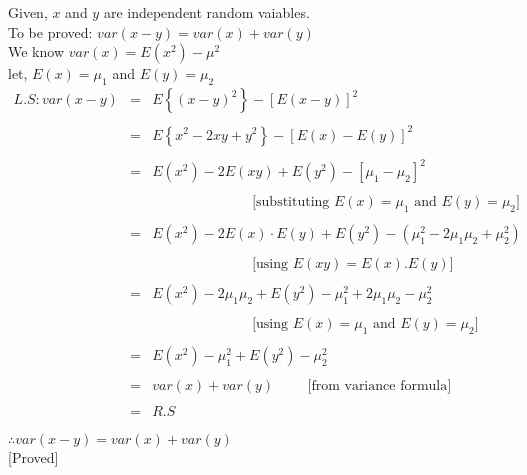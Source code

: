 \documentclass{article}
\begin{document}
\Large{
    Given, $x$ and $y$ are independent random vaiables. \\

    To be proved: $var (x-y) = var(x) + var(y)$\\

    We know $var(x) = E(x^2)-\mu^2$\\

    let, $E(x)=\mu_1$ and $E(y)=\mu_2$\\
    \begin{eqnarray*}
        L.S: var(x-y) &=& E\left\{(x-y)^2\right\} -\left[E(x-y)\right]^2\\\\
        &=& E\left\{x^2-2xy+y^2\right\}-\left[E(x)-E(y)\right]^2\\\\
        &=& E(x^2) - 2E(xy) + E(y^2)- [\mu_1 - \mu_2]^2\\\\
        && \hspace{3cm}\text{[substituting $E(x)=\mu_1$ and $E(y)=\mu_2$]}\\\\
        &=& E(x^2) - 2E(x)\cdot E(y)+ E(y^2)-\left(\mu_1^2 - 2\mu_1\mu_2 + \mu_2^2\right)\\\\
        && \hspace{3cm}\text{[using $E(xy)=E(x).E(y)$]}\\\\
        &=& E(x^2)-2\mu_1\mu_2+E(y^2)-\mu_1^2+2\mu_1\mu_2 -\mu_2^2\\\\
        && \hspace{3cm}\text{[using $E(x)=\mu_1$ and $E(y)= \mu_2$]}\\\\
        &=& E(x^2)-\mu_1^2+E(y^2)-\mu_2^2\\\\
        &=& var(x)+var(y) \hspace{1cm}\text{[from variance formula]}\\\\
        &=& R.S
    \end{eqnarray*}

$\therefore var(x-y) = var(x) + var(y)$\\

\hspace{7cm}[Proved]

}
\newpage
\end{document}
